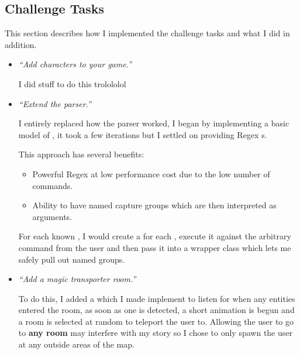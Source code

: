 \documentclass{article}
\begin{document}
\begin{multicols}{2}
        \section{Challenge Tasks}

            This section describes how I implemented the challenge tasks and what I did in addition.

            \begin{itemize}[leftmargin=*]
                \item \textit{``Add characters to your game.''}
                
                    I did stuff to do this trolololol

                \item \textit{``Extend the parser.''}
                
                    I entirely replaced how the parser worked, I began by implementing a basic model of , it took a few iterations but I settled on providing Regex s.

                    This approach has several benefits:

                    \begin{itemize}
                        \item Powerful Regex at low performance cost due to the low number of commands.
                        \item Ability to have named capture groups which are then interpreted as arguments.
                    \end{itemize}

                    For each known , I would create a  for each , execute it against the arbitrary command from the user and then pass it into a wrapper class  which lets me safely pull out named groups.
                
                \item \textit{``Add a magic transporter room.''}
                
                    To do this, I added a  which I made implement  to listen for when any entities entered the room, as soon as one is detected, a short animation is begun and a room is selected at random to teleport the user to. Allowing the user to go to \textbf{any room} may interfere with my story so I chose to only spawn the user at any outside areas of the map.
                

\end{itemize}
\end{multicols}
\end{document}
